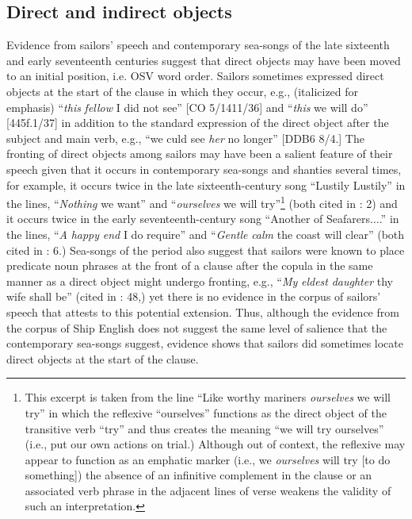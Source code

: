 \subsection{\textbf{Direct} \textbf{and} \textbf{indirect} \textbf{objects} }%

Evidence from sailors’ speech and contemporary sea-songs of the late sixteenth and early seventeenth centuries suggest that direct objects may have been moved to an initial position, i.e. OSV word order. Sailors sometimes expressed direct objects at the start of the clause in which they occur, e.g., (italicized for emphasis) “\textit{this} \textit{fellow} I did not see” [CO 5/1411/36] and “\textit{this} we will do” [445f.1/37] in addition to the standard expression of the direct object after the subject and main verb, e.g., “we culd see \textit{her} no longer” [DDB6 8/4.] The fronting of direct objects among sailors may have been a salient feature of their speech given that it occurs in contemporary sea-songs and shanties several times, for example, it occurs twice in the late sixteenth-century song “Lustily Lustily” in the lines, “\textit{Nothing} we want” and “\textit{ourselves} we will try”\footnote{This excerpt is taken from the line “Like worthy mariners \textit{ourselves} we will try” in which the reflexive “ourselves” functions as the direct object of the transitive verb “try” and thus creates the meaning “we will try ourselves” (i.e., put our own actions on trial.) Although out of context, the reflexive may appear to function as an emphatic marker (i.e., we \textit{ourselves} will try [to do something]) the absence of an infinitive complement in the clause or an associated verb phrase in the adjacent lines of verse weakens the validity of such an interpretation.}  (both cited in \citealt{Palmer1986}: 2) and it occurs twice in the early seventeenth-century song “Another of Seafarers....” in the lines,  “\textit{A} \textit{happy} \textit{end} I do require” and “\textit{Gentle} \textit{calm} the coast will clear” (both cited in \citealt{Palmer1986}: 6.) Sea-songs of the period also suggest that sailors were known to place predicate noun phrases at the front of a clause after the copula in the same manner as a direct object might undergo fronting, e.g., “\textit{My} \textit{eldest} \textit{daughter} thy wife shall be” (cited in \citealt{Palmer1986}: 48,) yet there is no evidence in the corpus of sailors’ speech that attests to this potential extension. Thus, although the evidence from the corpus of Ship English does not suggest the same level of salience that the contemporary sea-songs suggest, evidence shows that sailors did sometimes locate direct objects at the start of the clause. 

